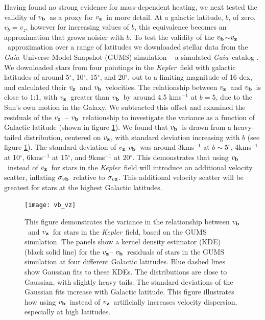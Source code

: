 \documentclass{aastex63}
\newcommand{\kepler}{{\it Kepler}}
\newcommand{\Gaia}{{\it Gaia}}
\newcommand{\degrees}{$^\circ$}
\newcommand{\vz}{$v_{\bf z}$}
\newcommand{\vb}{$v_{\bf b}$}
\newcommand{\sigmavb}{$\sigma_{v{\bf b}}$}
\newcommand{\sigmavz}{$\sigma_{v{\bf z}}$}
\begin{document}
Having found no strong evidence for mass-dependent heating, we next tested
the validity of \vb\ as a proxy for \vz\ in more detail.
At a galactic latitude, $b$, of zero, $v_b=v_z$, however for increasing values
of $b$, this equivalence becomes an approximation that grows noisier with $b$.
To test the validity of the \vb$\sim$\vz\ approximation over a range of
latitudes we downloaded stellar data from the \Gaia\ Universe Model Snapshot
(GUMS) simulation -- a simulated \Gaia\ catalog \citep{robin2012}.
We downloaded stars from four pointings in the \kepler\ field with galactic
latitudes of around 5\degrees, 10\degrees, 15\degrees, and 20\degrees, out to
a limiting magnitude of 16 dex, and calculated their \vz\ and \vb\ velocities.
The relationship between \vz\ and \vb\ is close to 1:1, with \vz\ greater than
\vb\ by around 4.5 kms$^{-1}$ at $b=5$, due to the Sun's own motion in the
Galaxy.
We subtracted this offset and examined the residuals of the \vz\ -- \vb\
relationship to investigate the variance as a function of Galactic latitude
(shown in figure \ref{fig:vb_vz}).
We found that \vb\ is drawn from a heavy-tailed distribution, centered on \vz,
with standard deviation increasing with $b$ (see figure \ref{fig:vb_vz}).
The standard deviation of \vz-\vb\ was around 3kms$^{-1}$ at $b \sim 5^\circ
$, 4kms$^{-1}$ at 10$^\circ$, 6kms$^{-1}$ at 15$^\circ$, and 9kms$^{-1}$ at
20$^\circ$.
This demonstrates that using \vb\ instead of \vz\ for stars in the \kepler\
field will introduce an additional velocity scatter, inflating \sigmavb\
relative to \sigmavz.
This additional velocity scatter will be greatest for stars at the highest
Galactic latitudes.

\begin{figure}
  \caption{
This figure demonstrates the variance in the relationship between \vb\ and
    \vz\ for stars in the \kepler\ field, based on the GUMS simulation.
The panels show a kernel density estimator (KDE) (black solid line) for
    the \vz -- \vb\ residuals of stars in the GUMS simulation at four
    different Galactic latitudes.
Blue dashed lines show Gaussian fits to these KDEs.
The distributions are close to Gaussian, with slightly heavy tails.
The standard deviations of the Gaussian fits increase with Galactic latitude.
This figure illustrates how using \vb\ instead of \vz\ artificially
    increases velocity dispersion, especially at high latitudes.
}
  \centering
    \texttt{[image: vb\_vz]}
\label{fig:vb_vz}
\end{figure}
\end{document}
